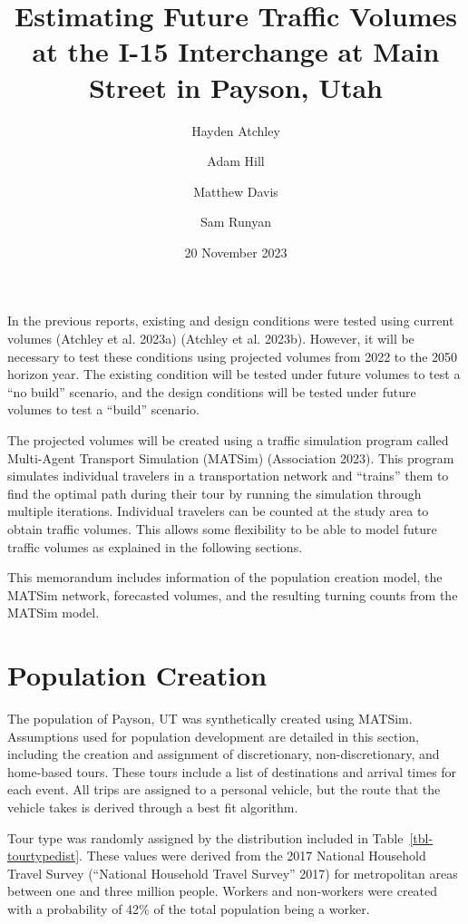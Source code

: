 \documentclass[
  letterpaper,
  DIV=11,
  numbers=noendperiod]{scrartcl}
\title{Estimating Future Traffic Volumes at the I-15 Interchange at Main
Street in Payson, Utah}
\author{Hayden Atchley \and Adam Hill \and Matthew Davis \and Sam
Runyan}
\date{20 November 2023}
\begin{document}
\maketitle
\ifdefined\Shaded\renewenvironment{Shaded}{\begin{tcolorbox}[breakable, boxrule=0pt, sharp corners, borderline west={3pt}{0pt}{shadecolor}, interior hidden, enhanced, frame hidden]}{\end{tcolorbox}}\fi

In the previous reports, existing and design conditions were tested
using current volumes (Atchley et al. 2023a) (Atchley et al. 2023b).
However, it will be necessary to test these conditions using projected
volumes from 2022 to the 2050 horizon year. The existing condition will
be tested under future volumes to test a ``no build'' scenario, and the
design conditions will be tested under future volumes to test a
``build'' scenario.

The projected volumes will be created using a traffic simulation program
called Multi-Agent Transport Simulation (MATSim) (Association 2023).
This program simulates individual travelers in a transportation network
and ``trains'' them to find the optimal path during their tour by
running the simulation through multiple iterations. Individual travelers
can be counted at the study area to obtain traffic volumes. This allows
some flexibility to be able to model future traffic volumes as explained
in the following sections.

This memorandum includes information of the population creation model,
the MATSim network, forecasted volumes, and the resulting turning counts
from the MATSim model.

\hypertarget{population-creation}{%
\section{Population Creation}\label{population-creation}}

The population of Payson, UT was synthetically created using MATSim.
Assumptions used for population development are detailed in this
section, including the creation and assignment of discretionary,
non-discretionary, and home-based tours. These tours include a list of
destinations and arrival times for each event. All trips are assigned to
a personal vehicle, but the route that the vehicle takes is derived
through a best fit algorithm.

Tour type was randomly assigned by the distribution included in
Table~\ref{tbl-tourtypedist}. These values were derived from the 2017
National Household Travel Survey ({``National {Household} {Travel}
{Survey}''} 2017) for metropolitan areas between one and three million
people. Workers and non-workers were created with a probability of 42\%
of the total population being a worker.
\end{document}
